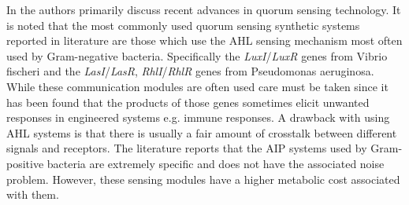 \documentclass[float=false, crop=false]{standalone}
\begin{document}
	In \cite{Choudhary2010} the authors primarily discuss recent advances in quorum sensing technology. It is noted that the most commonly used quorum sensing synthetic systems reported in literature are those which use the AHL sensing mechanism most often used by Gram-negative bacteria. Specifically the \textit{LuxI}/\textit{LuxR} genes from Vibrio fischeri and the \textit{LasI}/\textit{LasR}, \textit{RhlI}/\textit{RhlR} genes from Pseudomonas aeruginosa. While these communication modules are often used care must be taken since it has been found that the products of those genes sometimes elicit unwanted responses in engineered systems e.g. immune responses. A drawback with using AHL systems is that there is usually a fair amount of crosstalk between different signals and receptors. The literature reports that the AIP systems used by Gram-positive bacteria are extremely specific and does not have the associated noise problem. However, these sensing modules have a higher metabolic cost associated with them.

	\ifstandalone
			
		
	\fi
\end{document}
